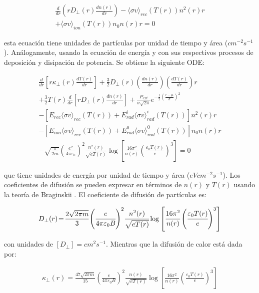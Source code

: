\begin{eqnarray}\label{eq:particles}
	\frac{d}{dr}\left(rD_\perp(r) \frac{dn(r)}{dr}\right) - \langle\sigma v\rangle_{rec}( T(r) )n^2(r)r \nonumber\\
	+ \langle\sigma v\rangle_{ion}(T(r)) n_0 n(r) r = 0
\end{eqnarray}

esta ecuación tiene unidades de partículas por unidad de tiempo y área ($cm^{-2}s^{-1}$). Análogamente, usando la ecuación de energía y con sus respectivos procesos de deposición y disipación de potencia. Se obtiene la siguiente ODE: 

\begin{eqnarray}\label{eq:energy}
	\frac{d}{dr}\left[r\kappa_\perp(r) \frac{dT(r)}{dr}\right]+ \frac{3}{2}D_\perp(r)\left(\frac{dn(r)}{dr}\right)\left(\frac{dT(r)}{dr}\right)r \nonumber\\
	+ \frac{3}{2}T(r)\frac{d}{dr}\left[rD_\perp(r) \frac{dn(r)}{dr}\right] + \frac{P_{ext}}{\sigma \sqrt{2\pi}}e^{-\frac{1}{2}\left(\frac{r - \mu}{\sigma}\right)^2} \nonumber\\
	- [E_{rec}\langle\sigma v\rangle_{rec}( T(r) ) + E_{rad}^i\langle\sigma v\rangle_{rad}^i( T(r) )]n^2(r) r \nonumber\\ 
	- [E_{ion}\langle\sigma v\rangle_{rec}( T(r) ) + E_{rad}^0\langle\sigma v\rangle_{rad}^0( T(r) )]n_0n(r)r \nonumber\\ 
	- \sqrt{\frac{\pi}{2m}}\!\left(\frac{e^2}{4\pi\varepsilon_0}\right)^2\!\frac{n^2(r)}{\sqrt{eT(r)}}\!\log\!{\left[\frac{16\pi^2}{n(r)}\!\left(\frac{\varepsilon_0T(r)}{e}\right)^3\!\right]} = 0
\end{eqnarray}

que tiene unidades de energía por unidad de tiempo y área ($eV cm^{-2}s^{-1}$). Los coeficientes de difusión se pueden expresar en términos de $n(r)$ y $T(r)$ usando la teoría de Braginskii \cite{helander2005}. El coeficiente de difusión de partículas es:

{\small\begin{eqnarray}\label{eq:Dperp}
	D_\perp(r)\!=\!\frac{2\sqrt{2\pi m}}{3}\!\left(\cfrac{e}{4\pi \varepsilon_0 B}\right)^2\!\cfrac{n^2(r)}{\sqrt{eT(r)}}\log{\left[\cfrac{16\pi^2}{n(r)} \left(\cfrac{\varepsilon_0T(r)}{e}\right)^3\right]} 
\end{eqnarray}}

con unidades de $[D_\perp] = cm^2 s^{-1}$. Mientras que la difusión de calor está dada por:

{\small \begin{eqnarray}\label{eq:kperp}
	\kappa_\perp(r)\!=\!\frac{47\sqrt{2\pi m}}{15}\!\left(\frac{e}{4\pi \varepsilon_0 B}\right)^2\!\frac{n(r)}{\sqrt{eT(r)}}\!\log{\left[\frac{16\pi^2}{n(r)}\!\left(\frac{\varepsilon_0T(r)}{e}\right)^3\right]} 
\end{eqnarray}}

